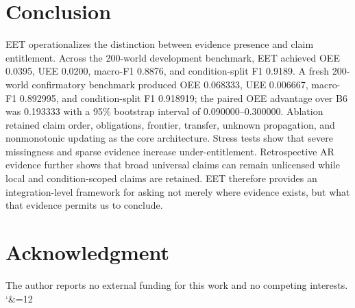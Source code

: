 \documentclass[journal]{IEEEtran}
\begin{document}
\section{Conclusion}
EET operationalizes the distinction between evidence presence and claim entitlement. Across the 200-world development benchmark, EET achieved OEE 0.0395, UEE 0.0200, macro-F1 0.8876, and condition-split F1 0.9189. A fresh 200-world confirmatory benchmark produced OEE 0.068333, UEE 0.006667, macro-F1 0.892995, and condition-split F1 0.918919; the paired OEE advantage over B6 was 0.193333 with a 95\% bootstrap interval of 0.090000--0.300000. Ablation retained claim order, obligations, frontier, transfer, unknown propagation, and nonmonotonic updating as the core architecture. Stress tests show that severe missingness and sparse evidence increase under-entitlement. Retrospective AR evidence further shows that broad universal claims can remain unlicensed while local and condition-scoped claims are retained. EET therefore provides an integration-level framework for asking not merely where evidence exists, but what that evidence permits us to conclude.

\section*{Acknowledgment}
The author reports no external funding for this work and no competing interests.
\balance
\begingroup\catcode`\&=12 \endgroup
\end{document}
